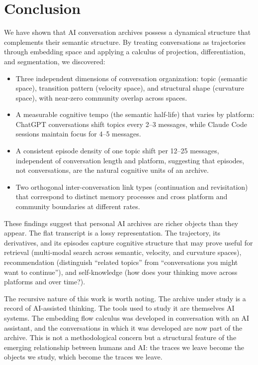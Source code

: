 \documentclass[11pt]{article}
\begin{document}
\section{Conclusion}

We have shown that AI conversation archives possess a dynamical structure that complements their semantic structure. By treating conversations as trajectories through embedding space and applying a calculus of projection, differentiation, and segmentation, we discovered:

\begin{itemize}
\item Three independent dimensions of conversation organization: topic (semantic space), transition pattern (velocity space), and structural shape (curvature space), with near-zero community overlap across spaces.
\item A measurable cognitive tempo (the semantic half-life) that varies by platform: ChatGPT conversations shift topics every 2--3 messages, while Claude Code sessions maintain focus for 4--5 messages.
\item A consistent episode density of one topic shift per 12--25 messages, independent of conversation length and platform, suggesting that episodes, not conversations, are the natural cognitive units of an archive.
\item Two orthogonal inter-conversation link types (continuation and revisitation) that correspond to distinct memory processes and cross platform and community boundaries at different rates.
\end{itemize}

These findings suggest that personal AI archives are richer objects than they appear. The flat transcript is a lossy representation. The trajectory, its derivatives, and its episodes capture cognitive structure that may prove useful for retrieval (multi-modal search across semantic, velocity, and curvature spaces), recommendation (distinguish ``related topics'' from ``conversations you might want to continue''), and self-knowledge (how does your thinking move across platforms and over time?).

The recursive nature of this work is worth noting. The archive under study is a record of AI-assisted thinking. The tools used to study it are themselves AI systems. The embedding flow calculus was developed in conversation with an AI assistant, and the conversations in which it was developed are now part of the archive. This is not a methodological concern but a structural feature of the emerging relationship between humans and AI: the traces we leave become the objects we study, which become the traces we leave.
\end{document}
